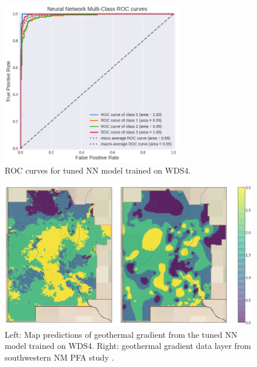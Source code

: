 \begin{figure}[htp]
\centering
\includegraphics[width=0.7\textwidth]{templates/images/Figure-NN-AUC.png}
\caption[Neural network ROC curves]{ROC curves for tuned NN model trained on WDS4.}
\label{fig:nn_auc}
\end{figure}

\begin{figure}[!htp]
\centering
\includegraphics[width=\textwidth]{templates/images/Figure-NN-FinalMap_Joint.png}
\caption[Neural network final map]{Left: Map predictions of geothermal gradient from the tuned NN model trained on WDS4. Right: geothermal gradient data layer from southwestern NM PFA study \protect\citep{bielicki_hydrogeolgic_2015}.}
\label{fig:nn_final_map}
\end{figure}

